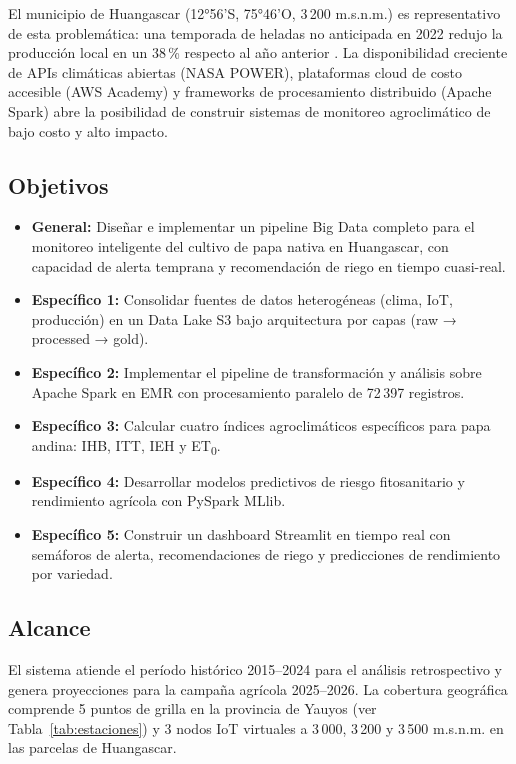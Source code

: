 \documentclass[12pt,a4paper]{article}
\begin{document}
El municipio de Huangascar (12°56'S, 75°46'O, 3\,200 m.s.n.m.) es
representativo de esta problemática: una temporada de heladas no
anticipada en 2022 redujo la producción local en un 38\,\% respecto al
año anterior \cite{senamhi2022}. La disponibilidad creciente de APIs
climáticas abiertas (NASA POWER), plataformas cloud de costo accesible
(AWS Academy) y frameworks de procesamiento distribuido (Apache Spark)
abre la posibilidad de construir sistemas de monitoreo agroclimático de
bajo costo y alto impacto.

\subsection{Objetivos}

\begin{itemize}[noitemsep]
  \item \textbf{General:} Diseñar e implementar un pipeline Big Data
    completo para el monitoreo inteligente del cultivo de papa nativa en
    Huangascar, con capacidad de alerta temprana y recomendación de riego
    en tiempo cuasi-real.
  \item \textbf{Específico 1:} Consolidar fuentes de datos heterogéneas
    (clima, IoT, producción) en un Data Lake S3 bajo arquitectura por
    capas (raw → processed → gold).
  \item \textbf{Específico 2:} Implementar el pipeline de transformación y
    análisis sobre Apache Spark en EMR con procesamiento paralelo de
    72\,397 registros.
  \item \textbf{Específico 3:} Calcular cuatro índices agroclimáticos
    específicos para papa andina: IHB, ITT, IEH y ET\textsubscript{0}.
  \item \textbf{Específico 4:} Desarrollar modelos predictivos de riesgo
    fitosanitario y rendimiento agrícola con PySpark MLlib.
  \item \textbf{Específico 5:} Construir un dashboard Streamlit en tiempo
    real con semáforos de alerta, recomendaciones de riego y predicciones
    de rendimiento por variedad.
\end{itemize}

\subsection{Alcance}

El sistema atiende el período histórico 2015--2024 para el análisis
retrospectivo y genera proyecciones para la campaña agrícola 2025--2026.
La cobertura geográfica comprende 5 puntos de grilla en la provincia de
Yauyos (ver Tabla~\ref{tab:estaciones}) y 3 nodos IoT virtuales a 3\,000,
3\,200 y 3\,500 m.s.n.m. en las parcelas de Huangascar.
\end{document}
